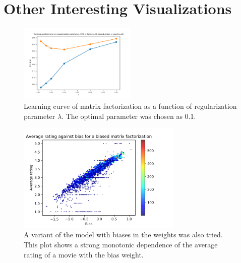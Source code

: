 \documentclass{article}
\begin{document}
\section{Other Interesting Visualizations}


\begin{figure}[H]
	\centering
	\includegraphics[width=0.5\textwidth]{SVDNoBias_RegErr.png}
	\caption{Learning curve of matrix factorization as a function of regularization parameter $\lambda$. The optimal parameter was chosen as 0.1.
	}
\end{figure}


\begin{figure}[H]
	\centering
	\includegraphics[width=0.7\textwidth]{RatingVsBias.png}
	\caption{A variant of the model with biases in the weights was also tried. This plot shows a strong monotonic dependence of the average rating of a movie with the bias weight.
	}
\end{figure}
\end{document}
